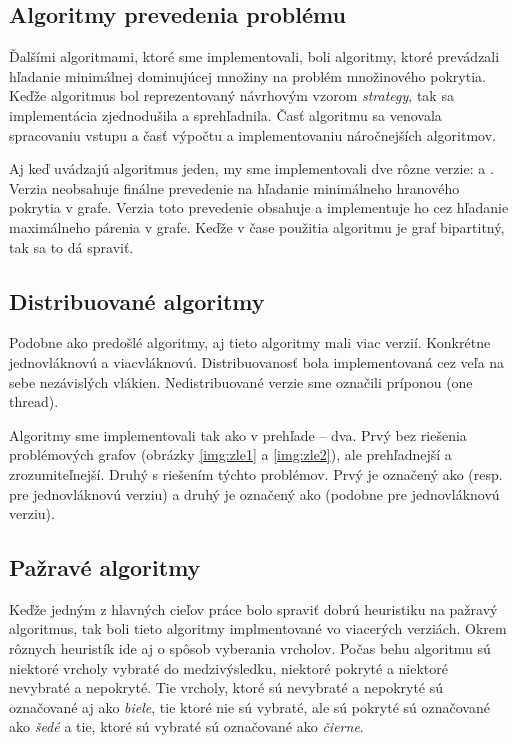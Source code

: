 \subsection{Algoritmy prevedenia problému}

Ďalšími algoritmami, ktoré sme implementovali, boli algoritmy, ktoré prevádzali 
hľadanie minimálnej dominujúcej množiny na problém množinového pokrytia. Keďže 
algoritmus bol reprezentovaný návrhovým vzorom \emph{strategy}, tak 
sa implementácia zjednodušila a sprehľadnila. Časť algoritmu sa venovala 
spracovaniu vstupu a časť výpočtu a implementovaniu náročnejších algoritmov. 

Aj keď \citet{fomin05} uvádzajú algoritmus jeden, my sme implementovali dve rôzne 
verzie:  a . Verzia  neobsahuje finálne 
prevedenie na hľadanie minimálneho hranového pokrytia v grafe. Verzia 
 toto prevedenie obsahuje a implementuje ho cez hľadanie 
maximálneho párenia v grafe. Keďže v čase použitia algoritmu je graf 
bipartitný, tak sa to dá spraviť.

\subsection{Distribuované algoritmy}

Podobne ako predošlé algoritmy, aj tieto algoritmy mali viac verzií. Konkrétne 
jednovláknovú a viacvláknovú. Distribuovanosť bola implementovaná cez veľa 
na sebe nezávislých vlákien. Nedistribuované verzie sme označili príponou 
 (one thread).

Algoritmy sme implementovali tak ako v prehľade -- dva. Prvý bez riešenia 
problémových grafov (obrázky \ref{img:zle1} a \ref{img:zle2}), ale prehľadnejší 
a zrozumiteľnejší. Druhý s riešením týchto problémov. Prvý je označený ako 
 (resp.~ pre jednovláknovú verziu) a druhý je 
označený ako  (podobne  pre jednovláknovú verziu).

\subsection{Pažravé algoritmy}

Keďže jedným z hlavných cieľov práce bolo spraviť dobrú heuristiku na pažravý 
algoritmus, tak boli tieto algoritmy implmentované vo viacerých verziách. Okrem 
rôznych heuristík ide aj o spôsob vyberania vrcholov. Počas behu algoritmu sú 
niektoré vrcholy vybraté do medzivýsledku, niektoré pokryté a niektoré 
nevybraté a nepokryté. Tie vrcholy, ktoré sú nevybraté a nepokryté sú 
označované aj ako \emph{biele}, tie ktoré nie sú vybraté, ale sú pokryté sú 
označované ako \emph{šedé} a tie, ktoré sú vybraté sú označované ako 
\emph{čierne}. 

